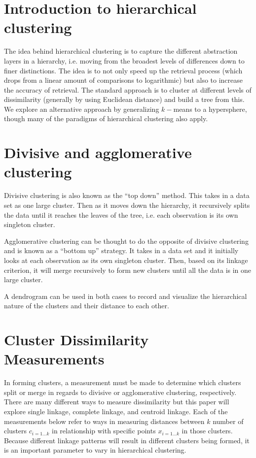 \documentclass[../tech_report_1.tex]{subfiles}
\begin{document}
\section{Introduction to hierarchical clustering}

The idea behind hierarchical clustering is to capture the different abstraction layers in a hierarchy, i.e. moving from the broadest levels of differences down to finer distinctions. The idea is to not only speed up the retrieval process (which drops from a linear amount of comparisons to logarithmic) but also to increase the accuracy of retrieval. The standard approach is to cluster at different levels of dissimilarity (generally by using Euclidean distance) and build a tree from this. We explore an alternative approach by generalizing $k-$means to a hypersphere, though many of the paradigms of hierarchical clustering also apply.

\section{Divisive and agglomerative clustering}


Divisive clustering \cite{schutze2008introduction} is also known as the ``top down'' method. This takes
in a data set as one large cluster. Then as it moves down the hierarchy,
it recursively splits the data until it reaches the leaves of the tree, i.e. each
observation is its own singleton cluster.

Agglomerative clustering can be thought to do the opposite of divisive
clustering and is known as a ``bottom up'' strategy. It takes in
a data set and it initially looks at each observation as its own singleton
cluster. Then, based on its linkage criterion, it will merge recursively
to form new clusters until all the data is in one large cluster.

A dendrogram \cite{langfelder2008defining} can be used in both cases to record and visualize the hierarchical nature of the
clusters and their distance to each other.

\section{Cluster Dissimilarity Measurements}


In forming clusters, a measurement must be made to determine which
clusters split or merge in regards to divisive or agglomerative clustering,
respectively. There are many different ways to measure dissimilarity
but this paper will explore single linkage, complete linkage, and
centroid linkage. Each of the measurements below refer to ways in
measuring distances between $k$ number of clusters $c_{i=1\dots k}$
in relationship with specific points $x_{i=1\dots k}$ in those clusters. Because different linkage patterns will result in different clusters being formed, it is an important parameter to vary in hierarchical clustering.
\end{document}
